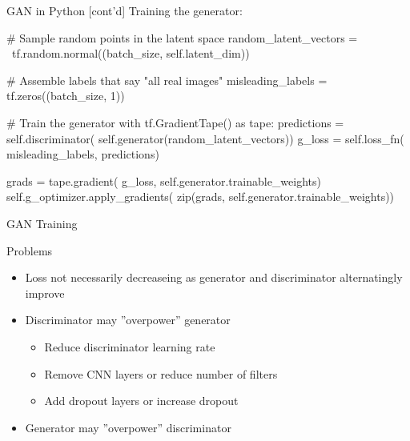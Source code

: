 \documentclass[ignorenonframetext,xcolor=x11names]{beamer}
\begin{document}
\begin{frame}[label=withcode,fragile]{GAN in Python \small [cont'd]}
Training the generator:
\begin{pythoncode}
        # Sample random points in the latent space
        random_latent_vectors = \
            tf.random.normal((batch_size, self.latent_dim))

        # Assemble labels that say "all real images"
        misleading_labels = tf.zeros((batch_size, 1))

        # Train the generator 
        with tf.GradientTape() as tape:
            predictions = self.discriminator(
                self.generator(random_latent_vectors))
            g_loss = self.loss_fn(
                misleading_labels, predictions)

        grads = tape.gradient(
            g_loss, 
            self.generator.trainable_weights)
        self.g_optimizer.apply_gradients(
            zip(grads, self.generator.trainable_weights))
\end{pythoncode}
\end{frame}


\begin{frame}[label=full]{GAN Training}

\begin{block}{Problems}

\begin{itemize}
   \item Loss not necessarily decreaseing as generator and discriminator alternatingly improve
   \item Discriminator may ''overpower'' generator
   \begin{itemize}
       \item Reduce discriminator learning rate
       \item Remove CNN layers or reduce number of filters
       \item Add dropout layers or increase dropout
   \end{itemize}
   \item Generator may ''overpower'' discriminator
\end{itemize}
\end{block}
\end{frame}
\end{document}
